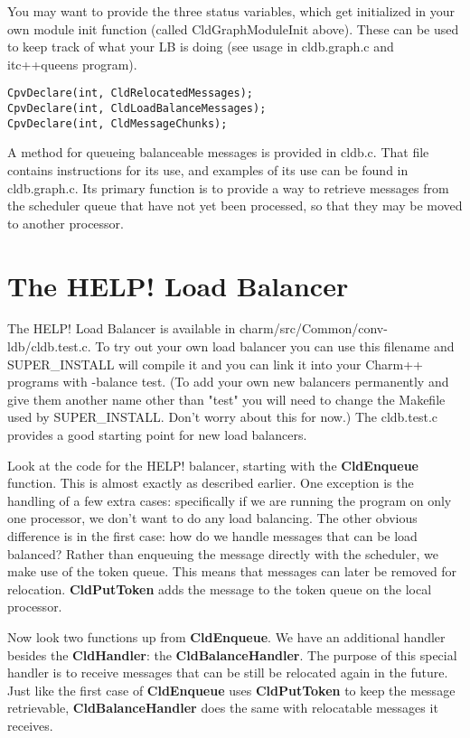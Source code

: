 \documentclass[11pt]{article}
\begin{document}
You may want to provide the three status variables, which get
initialized in your own module init function (called CldGraphModuleInit
above).  These can be used to keep track of what your LB is doing (see usage
in cldb.graph.c and itc++queens program).

\begin{verbatim}
CpvDeclare(int, CldRelocatedMessages);
CpvDeclare(int, CldLoadBalanceMessages);
CpvDeclare(int, CldMessageChunks);
\end{verbatim}

A method for queueing balanceable messages is provided in cldb.c.  That file
contains instructions for its use, and examples of its use can be found in
cldb.graph.c.  Its primary function is to provide a way to retrieve messages
from the scheduler queue that have not yet been processed, so that they may be
moved to another processor.


\section{The HELP! Load Balancer}

The HELP! Load Balancer is available in
charm/src/Common/conv-ldb/cldb.test.c.  To try out your own load balancer you
can use this filename and SUPER\_INSTALL will compile it and you can link it
into your Charm++ programs with -balance test.  (To add your own new balancers
permanently and give them another name other than "test" you will need to
change the Makefile used by SUPER\_INSTALL. Don't worry about this for now.)
The cldb.test.c provides a good starting point for new load balancers.

Look at the code for the HELP! balancer, starting with the {\bf CldEnqueue}
function.  This is almost exactly as described earlier.  One exception is the
handling of a few extra cases: specifically if we are running the program on
only one processor, we don't want to do any load balancing.  The other obvious
difference is in the first case: how do we handle messages that can be load
balanced?  Rather than enqueuing the message directly with the scheduler, we
make use of the token queue.  This means that messages can later be removed
for relocation.  {\bf CldPutToken} adds the message to the token queue on the
local processor.

Now look two functions up from {\bf CldEnqueue}.  We have an additional
handler besides the {\bf CldHandler}: the {\bf CldBalanceHandler}.  The
purpose of this special handler is to receive messages that can be still be
relocated again in the future.  Just like the first case of {\bf CldEnqueue}
uses {\bf CldPutToken} to keep the message retrievable, {\bf
CldBalanceHandler} does the same with relocatable messages it receives.
\end{document}
